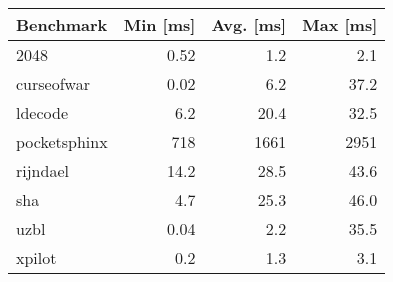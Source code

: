 \begin{tabular}{|l|r|r|r|}

\hline
{\bf Benchmark} & {\bf Min [ms]} & {\bf Avg. [ms]} & {\bf Max [ms]} \\ \hline\hline

2048         & 0.52 &  1.2 &  2.1 \\ \hline
curseofwar   & 0.02 &  6.2 & 37.2 \\ \hline
ldecode      & 6.2  & 20.4 & 32.5 \\ \hline
pocketsphinx & 718  & 1661 & 2951 \\ \hline
rijndael     & 14.2 & 28.5 & 43.6 \\ \hline
sha          & 4.7  & 25.3 & 46.0 \\ \hline
uzbl         & 0.04 & 2.2  & 35.5 \\ \hline
xpilot       & 0.2  & 1.3  & 3.1 \\ \hline

\end{tabular}
